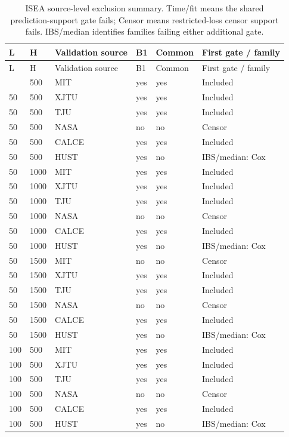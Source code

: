 \documentclass[10pt,a4paper]{article}
\begin{document}
{\scriptsize
\begin{longtable}{@{\extracolsep{\fill}}llllll}
\caption{ISEA source-level exclusion summary. Time/fit means the shared prediction-support gate fails; Censor means restricted-loss censor support fails. IBS/median identifies families failing either additional gate.}\label{tab:selection_exclusions}\\
\toprule
L & H & Validation source & B1 & Common & First gate / family\\\midrule
\endfirsthead
\toprule
L & H & Validation source & B1 & Common & First gate / family\\\midrule
\endhead
\bottomrule\endfoot
50 & 500 & MIT & yes & yes & Included\\
50 & 500 & XJTU & yes & yes & Included\\
50 & 500 & TJU & yes & yes & Included\\
50 & 500 & NASA & no & no & Censor\\
50 & 500 & CALCE & yes & yes & Included\\
50 & 500 & HUST & yes & no & IBS/median: Cox\\
50 & 1000 & MIT & yes & yes & Included\\
50 & 1000 & XJTU & yes & yes & Included\\
50 & 1000 & TJU & yes & yes & Included\\
50 & 1000 & NASA & no & no & Censor\\
50 & 1000 & CALCE & yes & yes & Included\\
50 & 1000 & HUST & yes & no & IBS/median: Cox\\
50 & 1500 & MIT & no & no & Censor\\
50 & 1500 & XJTU & yes & yes & Included\\
50 & 1500 & TJU & yes & yes & Included\\
50 & 1500 & NASA & no & no & Censor\\
50 & 1500 & CALCE & yes & yes & Included\\
50 & 1500 & HUST & yes & no & IBS/median: Cox\\
100 & 500 & MIT & yes & yes & Included\\
100 & 500 & XJTU & yes & yes & Included\\
100 & 500 & TJU & yes & yes & Included\\
100 & 500 & NASA & no & no & Censor\\
100 & 500 & CALCE & yes & yes & Included\\
100 & 500 & HUST & yes & no & IBS/median: Cox\\

\end{longtable}}
\end{document}
